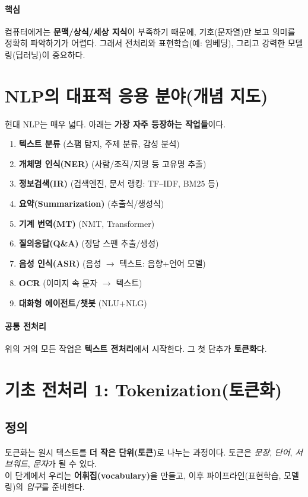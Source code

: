 \documentclass[12pt]{article}
\begin{document}
\paragraph{핵심} 컴퓨터에게는 \textbf{문맥/상식/세상 지식}이 부족하기 때문에, 기호(문자열)만 보고 의미를 정확히 파악하기가 어렵다. 그래서 전처리와 표현학습(예: 임베딩), 그리고 강력한 모델링(딥러닝)이 중요하다.

\section{NLP의 대표적 응용 분야(개념 지도)}
현대 NLP는 매우 넓다. 아래는 \textbf{가장 자주 등장하는 작업들}이다.
\begin{enumerate}[label=\textbf{\arabic*.}, left=1em]
  \item \textbf{텍스트 분류} (스팸 탐지, 주제 분류, 감성 분석)
  \item \textbf{개체명 인식(NER)} (사람/조직/지명 등 고유명 추출)
  \item \textbf{정보검색(IR)} (검색엔진, 문서 랭킹: TF--IDF, BM25 등)
  \item \textbf{요약(Summarization)} (추출식/생성식)
  \item \textbf{기계 번역(MT)} (NMT, Transformer)
  \item \textbf{질의응답(Q\&A)} (정답 스팬 추출/생성)
  \item \textbf{음성 인식(ASR)} (음성 $\to$ 텍스트: 음향+언어 모델)
  \item \textbf{OCR} (이미지 속 문자 $\to$ 텍스트)
  \item \textbf{대화형 에이전트/챗봇} (NLU+NLG)
\end{enumerate}

\paragraph{공통 전처리} 위의 거의 모든 작업은 \textbf{텍스트 전처리}에서 시작한다. 그 첫 단추가 \textbf{토큰화}다.

\section{기초 전처리 1: Tokenization(토큰화)}
\subsection{정의}
토큰화는 원시 텍스트를 \textbf{더 작은 단위(토큰)}로 나누는 과정이다. 토큰은 \emph{문장}, \emph{단어}, \emph{서브워드}, \emph{문자}가 될 수 있다.\\
이 단계에서 우리는 \textbf{어휘집(vocabulary)}을 만들고, 이후 파이프라인(표현학습, 모델링)의 \textit{입구}를 준비한다.
\end{document}
